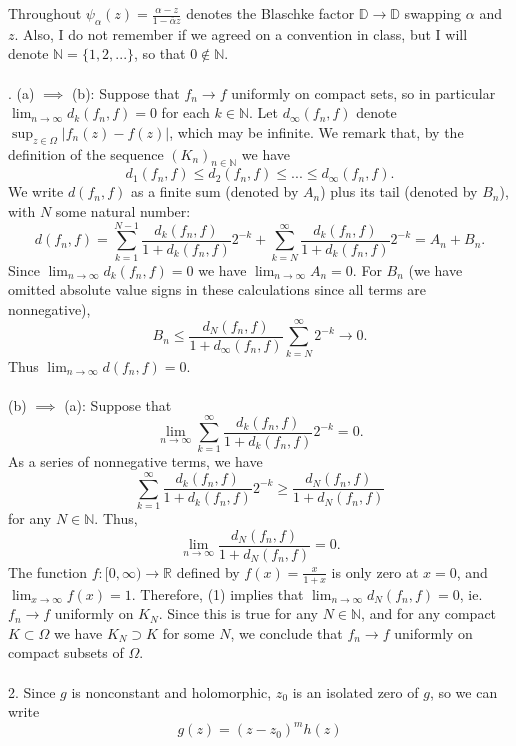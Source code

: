 \documentclass{article}
\newcommand{\R}{\mathbb{R}}
\newcommand{\N}{\mathbb{N}}
\newcommand{\D}{\mathbb{D}}
\begin{document}
\large 

\vspace{0.05in}
Throughout $\psi_{\alpha}(z) = \frac{\alpha - z}{1-\overline{\alpha}z}$ denotes the Blaschke factor $\D \to \D$ swapping $\alpha $ and $z$. Also, I do not remember if we agreed on a convention in class, but I will denote $\N = \{1,2,...\}$, so that $0 \not\in \N$. \\ \\
. (a) $\implies$ (b): Suppose that $f_n \to f$ uniformly on compact sets, so in particular $\lim_{n\to \infty} d_k(f_n, f) = 0$ for each $k \in \N$. Let $d_{\infty}(f_n,f)$ denote $\sup_{z\in \Omega} |f_n(z) - f(z)|$, which may be infinite. We remark that, by the definition of the sequence $(K_n)_{n\in \N}$ we have 
$$
d_1(f_n,f) \leq d_2(f_n,f) \leq ... \leq d_{\infty} (f_n,f).
$$
We write $d(f_n,f)$ as a finite sum (denoted by $A_n$) plus its tail (denoted by $B_n$), with $N$ some natural number:
$$
d(f_n,f) = \sum_{k=1}^{N-1} \frac{d_k(f_n,f)}{1+d_k(f_n,f)} 2^{-k} + \sum_{k=N}^{\infty} \frac{d_k(f_n,f)}{1+d_k(f_n,f)}2^{-k} = A_n + B_n.
$$
Since $\lim_{n\to \infty} d_k(f_n,f) = 0$ we have $\lim_{n\to \infty} A_n = 0$. For $B_n$ (we have omitted absolute value signs in these calculations since all terms are nonnegative),
$$
B_n \leq \frac{d_N(f_n,f)}{1+d_{\infty}(f_n,f)} \sum_{k=N}^{\infty} 2^{-k} \to 0.
$$
Thus $\lim_{n\to \infty}d(f_n,f) = 0$. \\ \\
(b) $\implies$ (a): Suppose that $$\lim_{n\to \infty} \sum_{k=1}^{\infty} \frac{d_k(f_n,f)}{1+d_k(f_n,f)}2^{-k} = 0.$$ As a series of nonnegative terms, we have
$$
\sum_{k=1}^{\infty} \frac{d_k(f_n,f)}{1+d_k(f_n,f)}2^{-k} \geq \frac{d_N(f_n,f)}{1+d_N(f_n,f)}
$$
for any $N\in \N$. Thus, 
\begin{equation}
    \lim_{n\to \infty} \frac{d_N(f_n,f)}{1+d_N(f_n,f)} = 0.
\end{equation}
The function $f\colon[0,\infty) \to \R$ defined by $f(x) = \frac{x}{1+x}$ is only zero at $x=0$, and $\lim_{x \to \infty} f(x) = 1$. Therefore, (1)
implies that $\lim_{n\to \infty} d_N(f_n,f) = 0$, ie. $f_n\to f$ uniformly on $K_N$. Since this is true for any $N\in \N$, and for any compact $K\subset \Omega$ we have $K_N \supset K$ for some $N$, we conclude that $f_n\to f$ uniformly on compact subsets of $\Omega$.
\\ \\
2. Since $g$ is nonconstant and holomorphic, $z_0$ is an isolated zero of $g$, so we can write 
\begin{equation}
g(z) = (z-z_0)^m h(z)
\end{equation}
\end{document}
